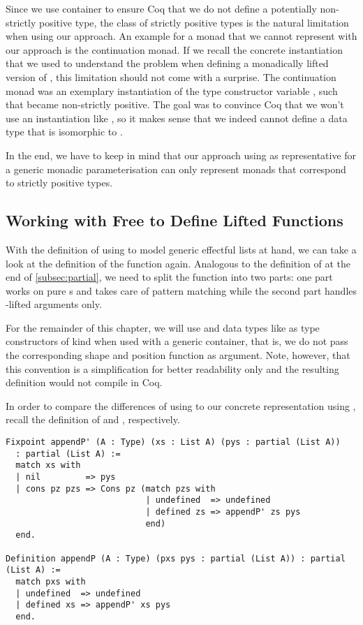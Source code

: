 Since we use container to ensure Coq that we do not define a potentially non-strictly positive type, the class of strictly positive types is the natural limitation when using our approach.
An example for a monad that we cannot represent with our approach is the continuation monad.
If we recall the concrete instantiation that we used to understand the problem when defining a monadically lifted version of , this limitation should not come with a surprise.
The continuation monad  was an exemplary instantiation of the type constructor variable , such that  became non-strictly positive.
The goal was to convince Coq that we won't use an instantiation like , so it makes sense that we indeed cannot define a data type that is isomorphic to .

In the end, we have to keep in mind that our approach using  as representative for a generic monadic parameterisation can only represent monads that correspond to strictly positive types.

\subsection{Working with Free to Define Lifted Functions}
\label{subsec:liftedFunctions}

With the definition of  using  to model generic effectful lists at hand, we can take a look at the definition of the function  again.
Analogous to the definition of  at the end of \autoref{subsec:partial}, we need to split the function into two parts: one part works on pure s and takes care of pattern matching while the second part handles -lifted arguments only.

For the remainder of this chapter, we will use  and data types like  as type constructors of kind  when used with a generic container, that is, we do not pass the corresponding shape and position function as argument.
Note, however, that this convention is a simplification for better readability only and the resulting definition would not compile in Coq.

In order to compare the differences of using  to our concrete representation using , recall the definition of  and , respectively.

\begin{verbatim}
Fixpoint appendP' (A : Type) (xs : List A) (pys : partial (List A))
  : partial (List A) :=
  match xs with
  | nil         => pys
  | cons pz pzs => Cons pz (match pzs with
                            | undefined  => undefined
                            | defined zs => appendP' zs pys
                            end)
  end.

Definition appendP (A : Type) (pxs pys : partial (List A)) : partial (List A) :=
  match pxs with
  | undefined  => undefined
  | defined xs => appendP' xs pys
  end.
\end{verbatim}

